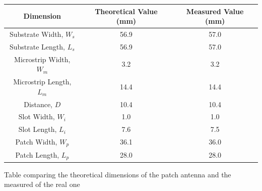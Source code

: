 \documentclass[]{article}
\begin{document}
\newpage


\begin{center}
	 \captionsetup{type=table} %
	\begin{tabular}{|c|c|c|}
		\hline
		\textbf{Dimension} & \textbf{Theoretical Value (mm)} & \textbf{Measured Value (mm)} \\
		\hline
		Substrate Width, $W_s$ & 56.9 & 57.0\\
		\hline
		Substrate Length, $L_s$ & 56.9 & 57.0\\
		\hline
		Microstrip Width, $W_m$ & 3.2 & 3.2\\
		\hline
		Microstrip Length, $L_m$ & 14.4& 14.4\\
		\hline
		Distance, $D$ & 10.4 & 10.4\\
		\hline
		Slot Width, $W_i$ & 1.0 & 1.0\\
		\hline
		Slot Length, $L_i$ & 7.6 & 7.5\\
		\hline
		Patch Width, $W_p$ & 36.1 & 36.0\\
		\hline
		Patch Length, $L_p$ & 28.0 & 28.0\\
		\hline
	\end{tabular}
	\caption{Table comparing the theoretical dimensions of the patch antenna and the measured of the real one}
	\label{tab:COMPARINGREALANDTEOR}
\end{center}

\end{document}
